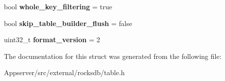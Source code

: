 \begin{DoxyCompactItemize}
\item 
bool {\bfseries whole\+\_\+key\+\_\+filtering} = true\hypertarget{structrocksdb_1_1BlockBasedTableOptions_a28ac408b75f3a8ce18174ef0314790cb}{}\label{structrocksdb_1_1BlockBasedTableOptions_a28ac408b75f3a8ce18174ef0314790cb}

\item 
bool {\bfseries skip\+\_\+table\+\_\+builder\+\_\+flush} = false\hypertarget{structrocksdb_1_1BlockBasedTableOptions_a9134bd76833f7acda42d5ed177f94b62}{}\label{structrocksdb_1_1BlockBasedTableOptions_a9134bd76833f7acda42d5ed177f94b62}

\item 
uint32\+\_\+t {\bfseries format\+\_\+version} = 2\hypertarget{structrocksdb_1_1BlockBasedTableOptions_a6c14b0303d48e4d6a2ceec75b2d4e0ae}{}\label{structrocksdb_1_1BlockBasedTableOptions_a6c14b0303d48e4d6a2ceec75b2d4e0ae}

\end{DoxyCompactItemize}


The documentation for this struct was generated from the following file\+:\begin{DoxyCompactItemize}
\item 
Appserver/src/external/rocksdb/table.\+h\end{DoxyCompactItemize}
